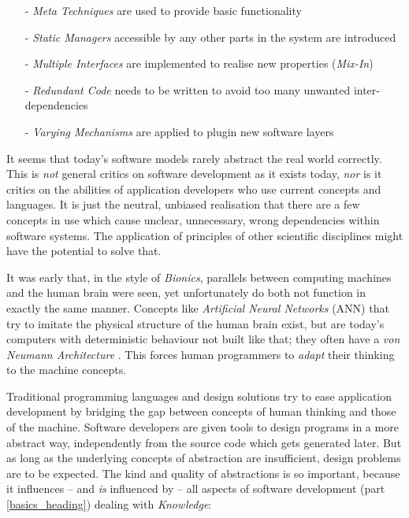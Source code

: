\begin{itemize}
    \item[-] \emph{Meta Techniques} are used to provide basic functionality
    \item[-] \emph{Static Managers} accessible by any other parts in the system
        are introduced
    \item[-] \emph{Multiple Interfaces} are implemented to realise new
        properties (\emph{Mix-In})
    \item[-] \emph{Redundant Code} needs to be written to avoid too many
        unwanted inter-dependencies
    \item[-] \emph{Varying Mechanisms} are applied to plugin new software layers
\end{itemize}

It seems that today's software models rarely abstract the real world correctly.
This is \emph{not} general critics on software development as it exists today,
\emph{nor} is it critics on the abilities of application developers who use
current concepts and languages. It is just the neutral, unbiased realisation
that there are a few concepts in use which cause unclear, unnecessary, wrong
dependencies within software systems. The application of principles of other
scientific disciplines might have the potential to solve that.

It was early that, in the style of \emph{Bionics}, parallels between computing
machines and the human brain were seen, yet unfortunately do both not function
in exactly the same manner. Concepts like \emph{Artificial Neural Networks} (ANN)
that try to imitate the
physical structure of the human brain exist, but are today's computers with
deterministic behaviour not built like that; they often have a
\emph{von Neumann Architecture} \cite{philippow}. This forces human programmers
to \emph{adapt} their thinking to the machine concepts.

Traditional programming languages and design solutions try to ease application
development by bridging the gap between concepts of human thinking and those of
the machine. Software developers are given tools to design programs in a more
abstract way, independently from the source code which gets generated later.
But as long as the underlying concepts of abstraction are insufficient, design
problems are to be expected. The kind and quality of abstractions is so
important, because it influences -- and \emph{is} influenced by -- all aspects
of software development (part \ref{basics_heading}) dealing with
\emph{Knowledge}:

